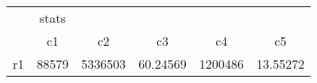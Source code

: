 \begin{tabular}{l*{5}{c}}
\hline\hline
            &       stats&            &            &            &            \\
            &          c1&          c2&          c3&          c4&          c5\\
\hline
r1          &       88579&     5336503&    60.24569&     1200486&    13.55272\\
\hline\hline
\end{tabular}
